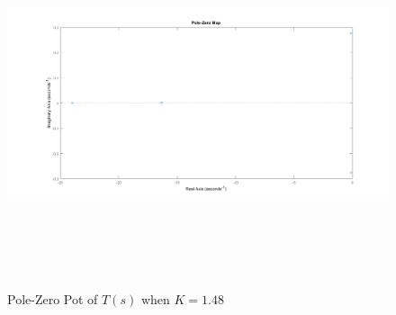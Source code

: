 \documentclass[12pt]{article} %
\begin{document}
\begin{figure}
\caption{Pole-Zero Pot of $T(s)$ when $K=1.48$}
\includegraphics[height=10cm, width = 16cm]{poleplacementpoles.png}
\label{fig:pz4}
\centering
\end{figure}
\end{document}
